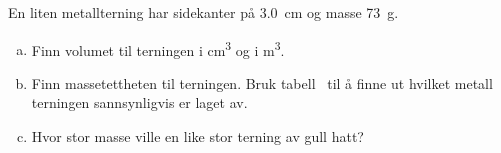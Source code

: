 %
En liten metallterning har sidekanter på \SI{3.0}{\centi\metre} og masse \SI{73}{\gram}.
\begin{enumerate}[a)]
    \item Finn volumet til terningen i \si{\centi\metre\cubed} og i \si{\metre\cubed}.
    \item Finn massetettheten til terningen. Bruk tabell~ til å finne ut hvilket metall terningen sannsynligvis er laget av.
    \item Hvor stor masse ville en like stor terning av gull hatt?
\end{enumerate}
%
